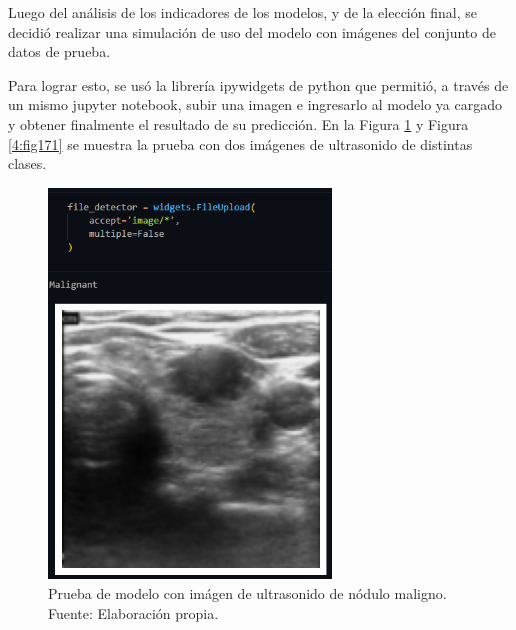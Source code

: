 Luego del análisis de los indicadores de los modelos, y de la elección final, se decidió realizar una simulación de uso del modelo con imágenes del conjunto de datos de prueba.

Para lograr esto, se usó la librería ipywidgets de python que permitió, a través de un mismo jupyter notebook, subir una imagen e ingresarlo al modelo ya cargado y obtener finalmente el resultado de su predicción. En la Figura \ref{4:fig170} y Figura \ref{4:fig171} se muestra la prueba con dos imágenes de ultrasonido de distintas clases.

\begin{figure}[H]
	\begin{center}
		\includegraphics[width=0.67\textwidth]{4/figures/simulacion_modelo_malign.PNG}
		\caption[Prueba de modelo con imágen de ultrasonido de nódulo maligno]{Prueba de modelo con imágen de ultrasonido de nódulo maligno. \\
		Fuente: Elaboración propia.}
		\label{4:fig170}
	\end{center}
\end{figure}

